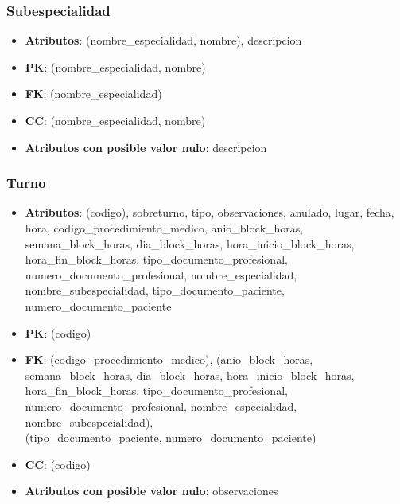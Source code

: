 \documentclass[a4paper,11pt]{article}
\begin{document}
\subsubsection{\textbf{Subespecialidad}}

\begin{itemize}

\item 
\textbf{Atributos}: (nombre\_especialidad, nombre), descripcion

\item 
\textbf{PK}: (nombre\_especialidad, nombre)

\item
\textbf{FK}: (nombre\_especialidad)

\item 
\textbf{CC}: (nombre\_especialidad, nombre)

\item 
\textbf{Atributos con posible valor nulo}: descripcion

\end{itemize}
\subsubsection{\textbf{Turno}}

\begin{itemize}

\item 
\textbf{Atributos}: (codigo), sobreturno, tipo, observaciones, anulado, lugar, fecha, hora,  codigo\_procedimiento\_medico, 
anio\_block\_horas, semana\_block\_horas, dia\_block\_horas, hora\_inicio\_block\_horas,\\
 hora\_fin\_block\_horas, tipo\_documento\_profesional, 
numero\_documento\_profesional, nombre\_especialidad, 
nombre\_subespecialidad, tipo\_documento\_paciente, numero\_documento\_paciente

\item 
\textbf{PK}: (codigo)

\item
\textbf{FK}: (codigo\_procedimiento\_medico), 
(anio\_block\_horas, semana\_block\_horas, dia\_block\_horas, hora\_inicio\_block\_horas, hora\_fin\_block\_horas,
tipo\_documento\_profesional, \\
numero\_documento\_profesional, nombre\_especialidad,
nombre\_subespecialidad), \\
(tipo\_documento\_paciente, numero\_documento\_paciente)

\item 
\textbf{CC}: (codigo)

\item 
\textbf{Atributos con posible valor nulo}: observaciones

\end{itemize}
\end{document}
